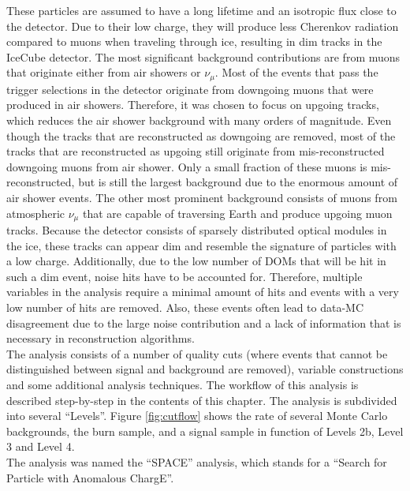 These particles are assumed to have a long lifetime and an isotropic flux close to the detector. Due to their low charge, they will produce less Cherenkov radiation compared to muons when traveling through ice, resulting in dim tracks in the IceCube detector. The most significant background contributions are from muons that originate either from air showers or $\nu_\mu$. Most of the events that pass the trigger selections in the detector originate from downgoing muons that were produced in air showers. Therefore, it was chosen to focus on upgoing tracks, which reduces the air shower background with many orders of magnitude. 
Even though the tracks that are reconstructed as downgoing are removed, most of the tracks that are reconstructed as upgoing still originate from mis-reconstructed downgoing muons from air shower. Only a small fraction of these muons is mis-reconstructed, but is still the largest background due to the enormous amount of air shower events.
The other most prominent background consists of muons from atmospheric $\nu_\mu$ that are capable of traversing Earth and produce upgoing muon tracks. Because the detector consists of sparsely distributed optical modules in the ice, these tracks can appear dim and resemble the signature of particles with a low charge.
Additionally, due to the low number of DOMs that will be hit in such a dim event, noise hits have to be accounted for. Therefore, multiple variables in the analysis require a minimal amount of hits and events with a very low number of hits are removed. Also, these events often lead to data-MC disagreement due to the large noise contribution and a lack of information that is necessary in reconstruction algorithms.\\

\noindent The analysis consists of a number of quality cuts (where events that cannot be distinguished between signal and background are removed), variable constructions and some additional analysis techniques. The workflow of this analysis is described step-by-step in the contents of this chapter. The analysis is subdivided into several ``Levels''. Figure \ref{fig:cutflow} shows the rate of several Monte Carlo backgrounds, the burn sample, and a signal sample in function of Levels 2b, Level 3 and Level 4.\\

\noindent The analysis was named the ``SPACE'' analysis, which stands for a ``Search for Particle with Anomalous ChargE''.

